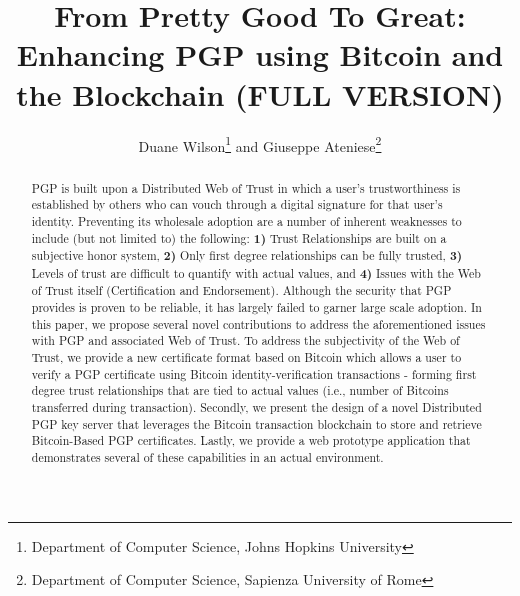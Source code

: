 \documentclass{llncs}
\begin{document}
\title{From Pretty Good To Great: Enhancing PGP using Bitcoin and the Blockchain (FULL VERSION)}
  \author{Duane Wilson\thanks{Department of Computer Science, Johns Hopkins University} and Giuseppe Ateniese\thanks{Department of Computer Science, Sapienza University of Rome}}
 \institute{}

\maketitle              

\begin{abstract}
PGP is built upon a Distributed Web of Trust in which a user's trustworthiness is established by others who can vouch through a digital signature for that user's identity.  Preventing its wholesale adoption are a number of inherent weaknesses to include (but not limited to) the following: \textbf{1)} Trust Relationships are built on a subjective honor system, \textbf{2)} Only first degree relationships can be fully trusted, \textbf{3)}  Levels of trust are difficult to quantify with actual values, and \textbf{4)} Issues with the Web of Trust itself (Certification and Endorsement).  Although the security that PGP provides is proven to be reliable, it has largely failed to garner large scale adoption.  In this paper, we propose several novel contributions to address the aforementioned issues with PGP and associated Web of Trust.  To address the subjectivity of the Web of Trust, we provide a new certificate format based on Bitcoin which allows a user to verify a PGP certificate using Bitcoin identity-verification transactions - forming first degree trust relationships that are tied to actual values (i.e., number of Bitcoins transferred during transaction).  Secondly, we present the design of a novel Distributed PGP key server that leverages the Bitcoin transaction blockchain to store and retrieve Bitcoin-Based PGP certificates.  Lastly, we provide a web prototype application that demonstrates several of these capabilities in an actual environment.
\end{abstract}
\end{document}
